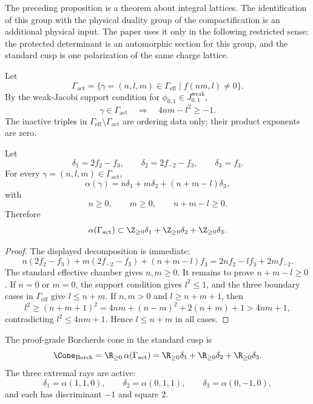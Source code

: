 \begin{remark}
The preceding proposition is a theorem about integral lattices.  The
identification of this group with the physical duality group of the
compactification is an additional physical input.  The paper uses it
only in the following restricted sense: the protected determinant is an
automorphic section for this group, and the standard cusp is one
polarization of the same charge lattice.
\end{remark}

\begin{definition}
Let
$$
\Gamma_{\mathrm{act}}
=\{\gamma=(n,l,m)\in\Gamma_{\mathrm{eff}}\mid f(nm,l)\neq0\}.
$$
By the weak-Jacobi support condition for $\phi_{0,1}\in J^{\mathrm{weak}}_{0,1}$,
$$
\gamma\in\Gamma_{\mathrm{act}}
\quad\Longrightarrow\quad
4nm-l^2\geq -1.
$$
The inactive triples in $\Gamma_{\mathrm{eff}}\setminus\Gamma_{\mathrm{act}}$
are ordering data only; their product exponents are zero.
\end{definition}

\begin{lemma}
Let
$$
\delta_1=2f_2-f_3,\qquad
\delta_2=2f_{-2}-f_3,\qquad
\delta_3=f_3.
$$
For every $\gamma=(n,l,m)\in\Gamma_{\mathrm{act}}$,
$$
\alpha(\gamma)=n\delta_1+m\delta_2+(n+m-l)\delta_3,
$$
with
$$
n\geq0,\qquad m\geq0,\qquad n+m-l\geq0.
$$
Therefore
$$
\alpha(\Gamma_{\mathrm{act}})
\subset
\Z_{\geq0}\delta_1+\Z_{\geq0}\delta_2+\Z_{\geq0}\delta_3.
$$
\end{lemma}

\begin{proof}
The displayed decomposition is immediate:
$$
n(2f_2-f_3)+m(2f_{-2}-f_3)+(n+m-l)f_3
=2nf_2-lf_3+2mf_{-2}.
$$
The standard effective chamber gives $n,m\geq0$.  It remains to prove
$n+m-l\geq0$.  If $n=0$ or $m=0$, the support condition gives
$l^2\leq1$, and the three boundary cases in $\Gamma_{\mathrm{eff}}$
give $l\leq n+m$.  If $n,m>0$ and $l\geq n+m+1$, then
$$
l^2\geq(n+m+1)^2
=4nm+(n-m)^2+2(n+m)+1>4nm+1,
$$
contradicting $l^2\leq4nm+1$.  Hence $l\leq n+m$ in all cases.
\end{proof}

\begin{proposition}
The proof-grade Borcherds cone in the standard cusp is
$$
\Cone_{\mathrm{Borch}}
=\R_{\geq0}\,\alpha(\Gamma_{\mathrm{act}})
=\R_{\geq0}\delta_1+\R_{\geq0}\delta_2+\R_{\geq0}\delta_3.
$$
The three extremal rays are active:
$$
\delta_1=\alpha(1,1,0),\qquad
\delta_2=\alpha(0,1,1),\qquad
\delta_3=\alpha(0,-1,0),
$$
and each has discriminant $-1$ and square $2$.
\end{proposition}

